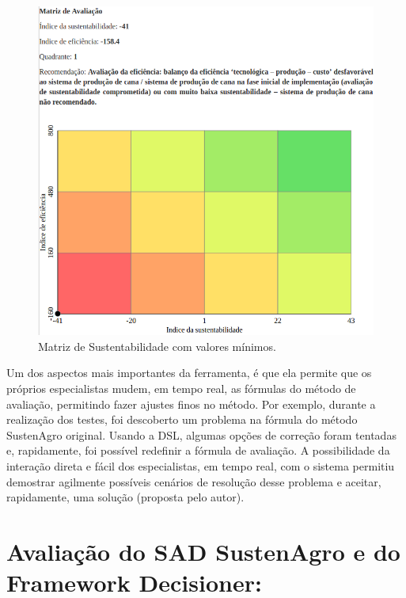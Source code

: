 \begin{figure}[H]
\begin{centering}
\includegraphics[width=1\columnwidth]{figures/Minimum}
\par\end{centering}
\caption{Matriz de Sustentabilidade com valores mínimos.\label{fig:Matriz-de-sustentabilidade-Minimos}}

\end{figure}

Um dos aspectos mais importantes da ferramenta, é que ela permite
que os próprios especialistas mudem, em tempo real, as fórmulas do
método de avaliação, permitindo fazer ajustes finos no método. Por
exemplo, durante a realização dos testes, foi descoberto um problema
na fórmula do método SustenAgro original. Usando a DSL, algumas opções
de correção foram tentadas e, rapidamente, foi possível redefinir
a fórmula de avaliação. A possibilidade da interação direta e fácil
dos especialistas, em tempo real, com o sistema permitiu demostrar
agilmente possíveis cenários de resolução desse problema e aceitar,
rapidamente, uma solução (proposta pelo autor).

\section{Avaliação do SAD SustenAgro e do Framework Decisioner: }

